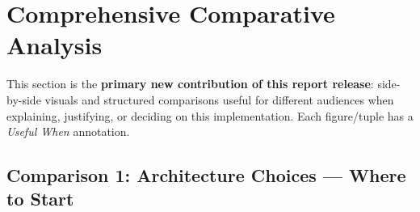 \documentclass[12pt,a4paper]{article}
\begin{document}
\newpage

\section{Comprehensive Comparative Analysis}

This section is the \textbf{primary new contribution of this report release}: side-by-side visuals and structured comparisons useful for different audiences when explaining, justifying, or deciding on this implementation. Each figure/tuple has a \textit{Useful When} annotation.

\subsection{Comparison 1: Architecture Choices — Where to Start}
\end{document}

